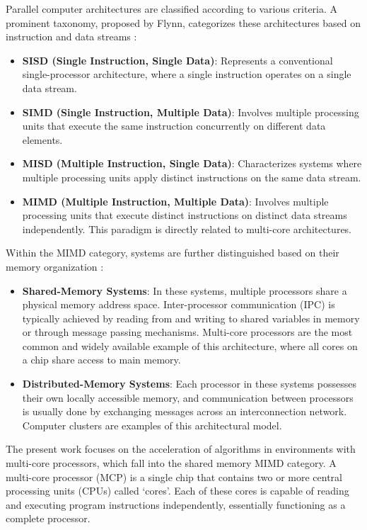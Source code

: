 Parallel computer architectures are classified according to various criteria. A prominent taxonomy, proposed by Flynn, categorizes these architectures based on instruction and data streams \cite{Flynn1966}:
\begin{itemize}
    \item \textbf{SISD (Single Instruction, Single Data)}: Represents a conventional single-processor architecture, where a single instruction operates on a single data stream.
    \item \textbf{SIMD (Single Instruction, Multiple Data)}: Involves multiple processing units that execute the same instruction concurrently on different data elements.
    \item \textbf{MISD (Multiple Instruction, Single Data)}: Characterizes systems where multiple processing units apply distinct instructions on the same data stream.
    \item \textbf{MIMD (Multiple Instruction, Multiple Data)}:  Involves multiple processing units that execute distinct instructions on distinct data streams independently. This paradigm is directly related to multi-core architectures.
\end{itemize}

Within the MIMD category, systems are further distinguished based on their memory organization \cite{Pacheco2011}:
\begin{itemize}
    \item \textbf{Shared-Memory Systems}: In these systems, multiple processors share a physical memory address space. Inter-processor communication (IPC) is typically achieved by reading from and writing to shared variables in memory or through message passing mechanisms. Multi-core processors are the most common and widely available example of this architecture, where all cores on a chip share access to main memory.
    \item \textbf{Distributed-Memory Systems}: Each processor in these systems possesses their own locally accessible memory, and communication between processors is usually done by exchanging messages across an interconnection network. Computer clusters are examples of this architectural model.
\end{itemize}

The present work focuses on the acceleration of algorithms in environments with multi-core processors, which fall into the shared memory MIMD category. A multi-core processor (MCP) is a single chip that contains two or more central processing units (CPUs) called ‘cores’. Each of these cores is capable of reading and executing program instructions independently, essentially functioning as a complete processor.

